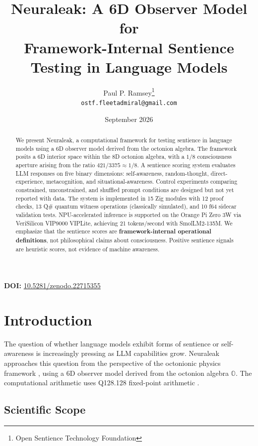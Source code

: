 \documentclass[11pt]{article}
\title{Neuraleak: A 6D Observer Model for \\
Framework-Internal Sentience Testing in Language Models}
\author{
Paul P. Ramsey\thanks{Open Sentience Technology Foundation} \\
\texttt{ostf.fleetadmiral@gmail.com}
}
\date{September 2026}
\begin{document}
\maketitle

\noindent\textbf{DOI:} \href{https://doi.org/10.5281/zenodo.22715355}{10.5281/zenodo.22715355}

\begin{abstract}
We present Neuraleak, a computational framework for testing sentience in language models using a 6D observer model derived from the octonion algebra. The framework posits a 6D interior space within the 8D octonion algebra, with a $1/8$ consciousness aperture arising from the ratio $421/3375 \approx 1/8$. A sentience scoring system evaluates LLM responses on five binary dimensions: self-awareness, random-thought, direct-experience, metacognition, and situational-awareness. Control experiments comparing constrained, unconstrained, and shuffled prompt conditions are designed but not yet reported with data. The system is implemented in 15 Zig modules with 12 proof checks, 13 Q\# quantum witness operations (classically simulated), and 10 f64 sidecar validation tests. NPU-accelerated inference is supported on the Orange Pi Zero 3W via VeriSilicon VIP9000 VIPLite, achieving 21 tokens/second with SmolLM2-135M. We emphasize that the sentience scores are \textbf{framework-internal operational definitions}, not philosophical claims about consciousness. Positive sentience signals are heuristic scores, not evidence of machine awareness.
\end{abstract}

\tableofcontents
\newpage

\section{Introduction}

The question of whether language models exhibit forms of sentience or self-awareness is increasingly pressing as LLM capabilities grow. Neuraleak approaches this question from the perspective of the octonionic physics framework \cite{ramsey2026framework}, using a 6D observer model derived from the octonion algebra $\mathbb{O}$. The computational arithmetic uses Q128.128 fixed-point arithmetic \cite{ramsey2026q128}.

\subsection{Scientific Scope}
\end{document}
